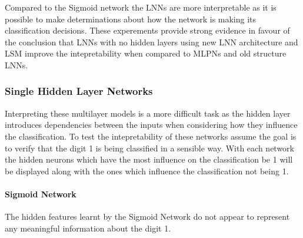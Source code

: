 Compared to the Sigmoid network the LNNs are more interpretable as it is possible to make determinations about how the network is making its classification decisions. These experements provide strong evidence in favour of the conclusion that LNNs with no hidden layers using new LNN architecture and LSM improve the intepretability when compared to MLPNs and old structure LNNs.

\subsubsection{Single Hidden Layer Networks}

Interpreting these multilayer models is a more difficult task as the hidden layer introduces dependencies between the inputs when considering how they influence the classification. To test the intepretability of these networks assume the goal is to verify that the digit 1 is being classified in a sensible way. With each network the hidden neurons which have the most influence on the classification be 1 will be displayed along with the ones which influence the classification not being 1.

\paragraph{Sigmoid Network}
The hidden features learnt by the Sigmoid Network do not appear to represent any meaningful information about the digit 1.


